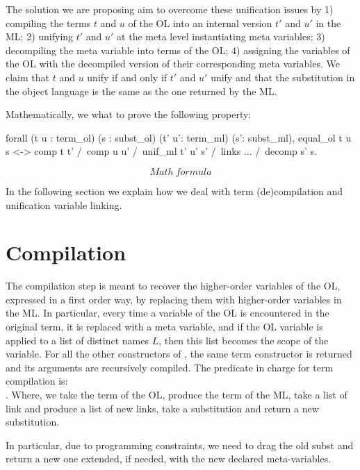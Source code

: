\documentclass[sigconf,natbib=false]{acmart}
\begin{document}
The solution we are proposing aim to overcome these unification issues by 1)
compiling the terms $t$ and $u$ of the OL into an internal version $t'$ and $u'$
in the ML; 2) unifying $t'$ and $u'$ at the meta level instantiating meta
variables; 3) decompiling the meta variable into terms of the OL; 4) assigning
the variables of the OL with the decompiled version of their corresponding meta
variables. We claim that $t$ and $u$ unify if and only if $t'$ and $u'$ unify
and that the substitution in the object language is the same as the one returned
by the ML.  

Mathematically, we what to prove the following property:

\begin{coqcode}
  forall (t  u : term_ol) (s : subst_ol) 
         (t' u': term_ml) (s': subst_ml), 
    equal_ol t u s <->
      comp t t' /\ comp u u' /\ 
      unif_ml t' u' s' /\ links ... /\ decomp s' s.
\end{coqcode}

$$Math\ formula$$

In the following section we explain how we deal with term (de)compilation and
unification variable linking.

\section[Compilation: fo\_tm to tm]{Compilation}

The compilation step is meant to recover the higher-order variables of the OL,
expressed in a first order way, by replacing them with higher-order variables in
the ML. In particular, every time a variable of the OL is encountered in the
original term, it is replaced with a meta variable, and if the OL variable is
applied to a list of distinct names $L$, then this list becomes the scope of the variable. 
For all the other constructors of
, the same term constructor is returned and its arguments are
recursively compiled. The predicate in charge for term compilation is:\\
\elpiIn{type comp tm -> tm -> links -> links -> subst -> subst -> o}.
Where, we take the term of the OL, produce the term of the ML, take a list
of link and produce a list of new links, take a substitution and return a 
new substitution.

In particular, due to programming constraints, we need to drag the old subst and
return a new one extended, if needed, with the new declared meta-variables.
\end{document}
